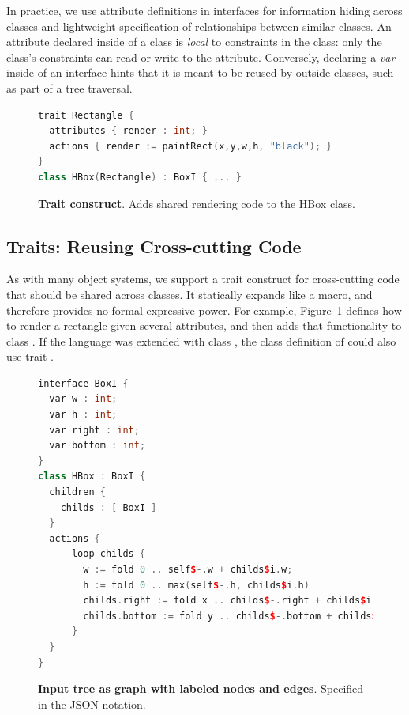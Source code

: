In practice, we  use attribute definitions in interfaces for information hiding across classes and lightweight specification of relationships between similar classes. An attribute declared inside of a class is \emph{local} to constraints in the class: only the class's constraints can read or write to the attribute. Conversely, declaring a \emph{var} inside of an interface hints that it is meant to be reused by outside classes, such as part of a tree traversal.

\begin{figure}
\begin{lstlisting}[language=C++,morekeywords={trait,class,attributes,actions}]
trait Rectangle {
  attributes { render : int; }
  actions { render := paintRect(x,y,w,h, "black"); }
}
class HBox(Rectangle) : BoxI { ... }
\end{lstlisting}
\caption{\textbf{Trait construct}. Adds shared rendering code to the HBox class.}
\label{fig:trait}
\end{figure}

\subsection{Traits: Reusing Cross-cutting Code}
As with many object systems, we support a trait construct for cross-cutting code that should be shared across classes. It statically expands like a macro, and therefore provides no formal expressive power. For example, Figure~\ref{fig:trait} defines how to render a rectangle given several attributes, and then adds that functionality to class . If the language was extended with class , the class definition of  could also use trait .






\begin{figure}
\begin{lstlisting}[language=C++,morekeywords={spawn,join,reverse,parallel_for}]
interface BoxI {
  var w : int;
  var h : int;
  var right : int;
  var bottom : int;
}
class HBox : BoxI {
  children {
    childs : [ BoxI ]
  }
  actions {
      loop childs {
        w := fold 0 .. self$-.w + childs$i.w;
        h := fold 0 .. max(self$-.h, childs$i.h)
        childs.right := fold x .. childs$-.right + childs$i.w;
        childs.bottom := fold y .. childs$-.bottom + childs$i.h;  
      }
  }
}
\end{lstlisting}
\caption{\textbf{Input tree as graph with labeled nodes and edges}. Specified in the JSON notation.}
\label{fig:loops}
\end{figure}

